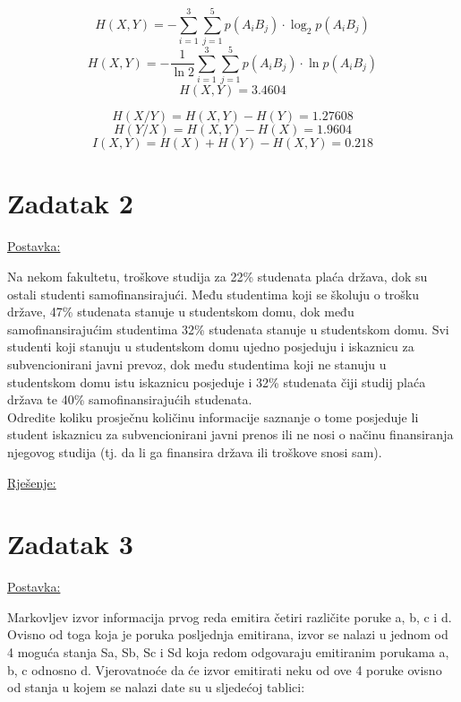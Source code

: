 \documentclass[12pt]{article}
\begin{document}
$$H(X, Y) = - \sum_{i = 1}^{3} \sum_{j = 1}^{5} p(A_i B_j) \cdot \log_2 p(A_i B_j)$$
$$H(X, Y) = - \frac{1}{\ln{2}} \sum_{i = 1}^{3} \sum_{j = 1}^{5} p(A_i B_j) \cdot \ln{p(A_i B_j)}$$
$$H(X, Y) = 3.4604$$

$$H(X / Y) = H(X, Y) - H(Y) = 1.27608$$
$$H(Y / X) = H(X, Y) - H(X) = 1.9604$$
$$I(X, Y) = H(X) + H(Y) - H(X, Y) = 0.218$$

\newpage

\section*{Zadatak 2\label{Z2}}

\underline{Postavka:}

Na nekom fakultetu, troškove studija za 22\% studenata plaća država, dok su ostali studenti samofinansirajući. Među studentima koji se školuju o trošku države, 47\% studenata stanuje u studentskom domu, dok među samofinansirajućim studentima 32\% studenata stanuje u studentskom domu. Svi studenti koji stanuju u studentskom domu ujedno posjeduju i iskaznicu za subvencionirani javni prevoz, dok među studentima koji ne stanuju u studentskom domu istu iskaznicu posjeduje i 32\% studenata čiji studij plaća država te 40\% samofinansirajućih studenata.\\

Odredite koliku prosječnu količinu informacije saznanje o tome posjeduje li student iskaznicu za subvencionirani javni prenos ili ne nosi o načinu finansiranja njegovog studija (tj. da li ga finansira država ili troškove snosi sam).

\underline{Rješenje:}\\





\newpage

\section*{Zadatak 3\label{Z3}}

\underline{Postavka:}

Markovljev izvor informacija prvog reda emitira četiri različite poruke a, b, c i d. Ovisno od toga koja je poruka posljednja emitirana, izvor se nalazi u jednom od 4 moguća stanja Sa, Sb, Sc i Sd koja redom odgovaraju emitiranim porukama a, b, c odnosno d. Vjerovatnoće da će izvor emitirati neku od ove 4 poruke ovisno od stanja u kojem se nalazi date su u sljedećoj tablici: 
\end{document}
